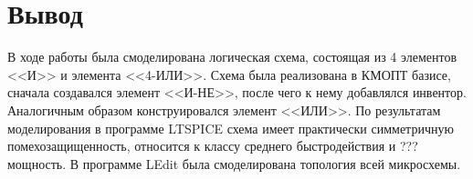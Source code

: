 \documentclass[a4paper,14pt]{article}
\begin{document}
\section{Вывод}

В ходе работы была смоделирована логическая схема, состоящая из 4 элементов <<И>> и элемента <<4-ИЛИ>>.
Схема была реализована в КМОПТ базисе, сначала создавался элемент <<И-НЕ>>, после чего к нему добавлялся инвентор.
Аналогичным образом конструировался элемент <<ИЛИ>>.
По результатам моделирования в программе LTSPICE схема имеет практически симметричную помехозащищенность, относится к классу среднего быстродействия и ??? мощность.
В программе LEdit была смоделирована топология всей микросхемы.
\end{document}
